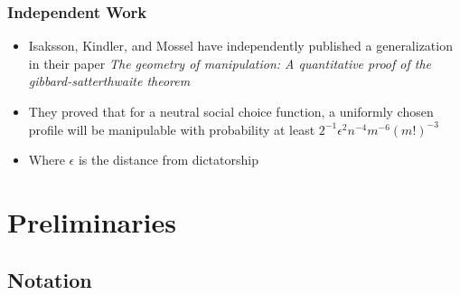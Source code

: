 \documentclass[aspectratio=169]{beamer}
\begin{document}
		\begin{frame}
			\frametitle{Independent Work}
			\begin{itemize}
				\item Isaksson, Kindler, and Mossel have independently published a generalization in their paper \emph{The geometry of manipulation: A quantitative proof of the gibbard-satterthwaite theorem}
				\item They proved that for a neutral social choice function, a uniformly chosen profile will be manipulable with probability at least $2^{-1} \epsilon^2 n^{-4} m^{-6} (m!)^{-3}$
				\item Where $\epsilon$ is the distance from dictatorship
			\end{itemize}

		\end{frame}


	\section{Preliminaries}
	\subsection{Notation}
\end{document}
